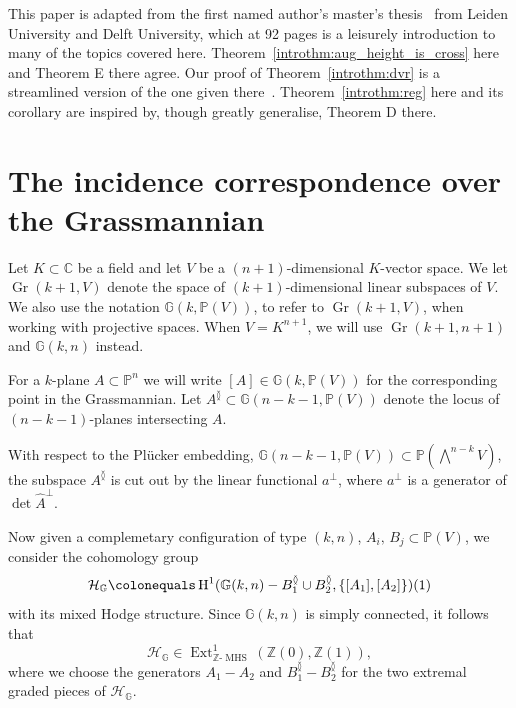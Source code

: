 \documentclass[11pt,a4paper]{amsart}
\newcommand{\C}{\mathbb{C}}
\newcommand{\G}{\mathbb{G}}
\renewcommand{\H}{\operatorname{H}}
\newcommand{\Pp}{\mathbb{P}}
\newcommand{\pn}{\mathbb{P}^{n}}
\newcommand{\pv}{\mathbb{P}(V)}
\newcommand{\Z}{\mathbb{Z}}
\DeclareMathOperator{\Ext}{Ext}
\DeclareMathOperator{\Gr}{Gr}
\theoremstyle{plain}
\theoremstyle{definition}
\theoremstyle{remark}
\DeclareMathOperator{\MHS}{MHS}
\newcommand{\ZMHS}{\Z\text{-}\MHS}
\newcommand{\ch}{\mathcal{H}}
\newcommand{\coleq}{\colonequals}
\begin{document}
This paper is adapted from the first named author's master's thesis~\cite{Bakker2026} from Leiden University and Delft University, which at 92 pages is a leisurely introduction to many of the topics covered here. Theorem~\ref{introthm:aug_height_is_cross} here and Theorem E there agree. Our proof of Theorem~\ref{introthm:dvr} is a streamlined version of the one given there~\cite[Thm~3.19]{Bakker2026}. Theorem~\ref{introthm:reg} here and its corollary are inspired by, though greatly generalise, Theorem D there.

\section{The incidence correspondence over the Grassmannian}

Let $K\subset \C$ be a field and let $V$ be a $(n+1)$-dimensional $K$-vector space. We let $\Gr(k+1,V)$ denote the space of $(k+1)$-dimensional linear subspaces of $V$. We also use the notation $\G(k,\pv)$, to refer to $\Gr(k+1,V)$, when working with projective spaces. When $V = K^{n+1}$, we will use $\Gr(k+1, n+1)$ and $\G(k, n)$ instead.

For a $k$-plane $A \subset \pn$ we will write $[A]\in \G(k,\pv)$ for the corresponding point in the Grassmannian. Let $A^\between  \subset \G(n-k-1,\pv)$ denote the locus of $(n-k-1)$-planes intersecting $A$. 

With respect to the Plücker embedding, $\G(n-k-1,\pv) \subset \Pp(\bigwedge^{n-k} V)$, the  subspace
$A^\between$ is cut out by the linear functional $a^\perp$, where $a^\perp$ is a generator of $\det {\hat A}^\perp$.

Now given a complemetary configuration of type $(k,n)$, $A_i,\, B_j\subset \pv$, we consider the cohomology group 
\begin{equation}\label{eq:hg}
\ch_\G \coleq \H^{1}(\G(k,n) - B_1^\between \cup B_2^\between, \{[A_1],[A_2]\})(1)
\end{equation}
with its mixed Hodge structure. Since $\G(k,n)$ is simply connected, it follows that
\[\ch_\G \in \Ext^1_{\ZMHS}(\Z(0),\Z(1)),\]
where we choose the generators $A_1-A_2$ and $B_1^\between - B_2^\between$ for the two extremal graded pieces of $\ch_\G$.
\end{document}
